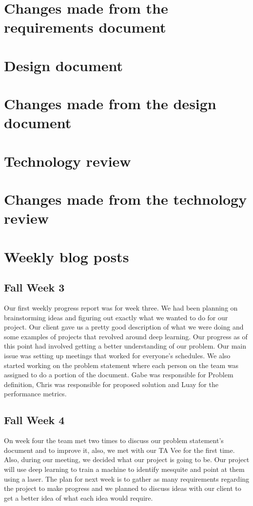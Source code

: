 \documentclass[onecolumn, draftclsnofoot,10pt, compsoc]{IEEEtran}
\begin{document}


\section{Changes made from the requirements document}

\section{Design document}



\section{Changes made from the design document}

\section{Technology review}



\section{Changes made from the technology review}

\section{Weekly blog posts}

\subsection{Fall Week 3}
Our first weekly progress report was for week three.
We had been planning on brainstorming ideas and figuring out exactly what we wanted to do for our project.
Our client gave us a pretty good description of what we were doing and some examples of projects that revolved around deep learning.
Our progress as of this point had involved getting a better understanding of our problem.
Our main issue was setting up meetings that worked for everyone's schedules.
We also started working on the problem statement where each person on the team was assigned to do a portion of the document.
Gabe was responsible for Problem definition, Chris was responsible for proposed solution and Luay for the performance metrics.

\subsection{Fall Week 4}
On week four the team met two times to discuss our problem statement's document and to improve it, also, we met with our TA Vee for the first time.
Also, during our meeting, we decided what our project is going to be.
Our project will use deep learning to train a machine to identify mesquite and point at them using a laser.
The plan for next week is to gather as many requirements regarding the project to make progress and we planned to discuss ideas with our client to get a better idea of what each idea would require.
\end{document}
